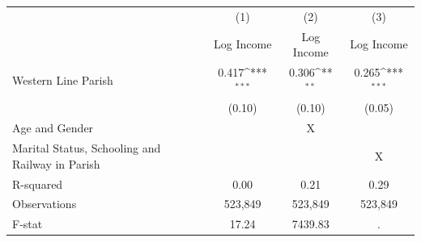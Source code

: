 {
\def\sym#1{\ifmmode^{#1}\else\(^{#1}\)\fi}
\begin{tabular}{l*{3}{c}}
\hline\hline
                    &\multicolumn{1}{c}{(1)}&\multicolumn{1}{c}{(2)}&\multicolumn{1}{c}{(3)}\\
                    &\multicolumn{1}{c}{Log Income}&\multicolumn{1}{c}{Log Income}&\multicolumn{1}{c}{Log Income}\\
\hline
Western Line Parish &       0.417\sym{***}&       0.306\sym{**} &       0.265\sym{***}\\
                    &      (0.10)         &      (0.10)         &      (0.05)         \\
\hline
Age and Gender      &                     &           X         &                     \\
Marital Status, Schooling and Railway in Parish&                     &                     &           X         \\
R-squared           &        0.00         &        0.21         &        0.29         \\
Observations        &     523,849         &     523,849         &     523,849         \\
F-stat              &       17.24         &     7439.83         &           .         \\
\hline\hline
\end{tabular}
}
